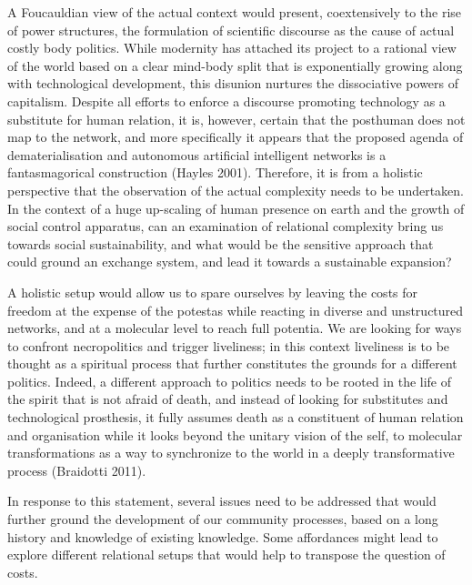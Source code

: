 A Foucauldian view of the actual context would present, coextensively to
the rise of power structures, the formulation of scientific discourse as
the cause of actual costly body politics. While modernity has attached
its project to a rational view of the world based on a clear mind-body
split that is exponentially growing along with technological
development, this disunion nurtures the dissociative powers of
capitalism. Despite all efforts to enforce a discourse promoting
technology as a substitute for human relation, it is, however, certain
that the posthuman does not map to the network, and more specifically it
appears that the proposed agenda of dematerialisation and autonomous
artificial intelligent networks is a fantasmagorical construction
(Hayles 2001). Therefore, it is from a holistic perspective that the
observation of the actual complexity needs to be undertaken. In the
context of a huge up-scaling of human presence on earth and the growth
of social control apparatus, can an examination of relational complexity
bring us towards social sustainability, and what would be the sensitive
approach that could ground an exchange system, and lead it towards a
sustainable expansion?

A holistic setup would allow us to spare ourselves by leaving the costs
for freedom at the expense of the potestas while reacting in diverse and
unstructured networks, and at a molecular level to reach full potentia.
We are looking for ways to confront necropolitics and trigger
liveliness; in this context liveliness is to be thought as a spiritual
process that further constitutes the grounds for a different politics.
Indeed, a different approach to politics needs to be rooted in the life
of the spirit that is not afraid of death, and instead of looking for
substitutes and technological prosthesis, it fully assumes death as a
constituent of human relation and organisation while it looks beyond the
unitary vision of the self, to molecular transformations as a way to
synchronize to the world in a deeply transformative process (Braidotti
2011).

In response to this statement, several issues need to be addressed that
would further ground the development of our community processes, based
on a long history and knowledge of existing knowledge. Some affordances
might lead to explore different relational setups that would help to
transpose the question of costs.

